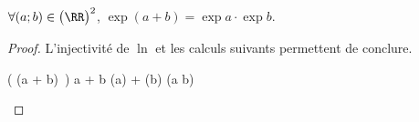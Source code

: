 \begin{fact}
	$\forall (a;b) \in \big( \RR \big)^2$,
	$\exp(a + b) = \exp a \cdot \exp b$.
\end{fact}


\begin{proof}
	L'injectivité de $\ln$ et les calculs suivants permettent de conclure.
	
	\begin{stepcalc}[style=ar*]
		\ln \big( \exp(a + b) \,\big)
		a + b
		\ln(\exp a) + \ln(\exp b)
		\ln(\exp a \cdot \exp b)
	\end{stepcalc}
\end{proof}